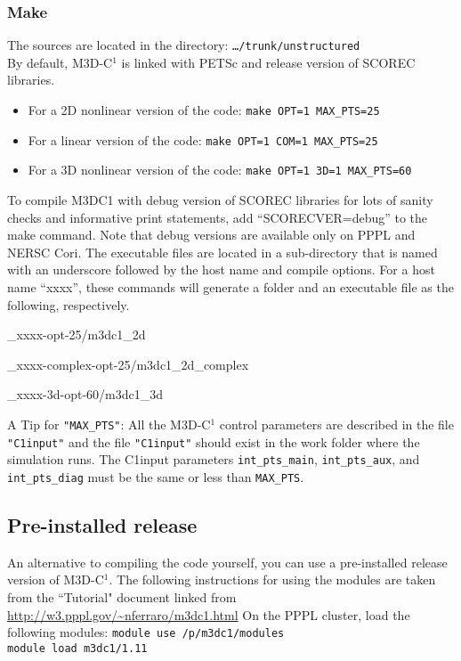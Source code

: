 \subsubsection{Make}
The sources are located in the directory: \texttt{\ldots/trunk/unstructured}
\\
By default, M3D-C$^{1}$ is linked with PETSc and release version of SCOREC libraries.
\\
\begin{itemize}
\item 	For a 2D nonlinear version of the code: \texttt{make OPT=1 MAX\_PTS=25}
\item	For a linear version of the code:  \texttt{make OPT=1 COM=1 MAX\_PTS=25}
\item	For a 3D nonlinear version of the code: \texttt{make OPT=1 3D=1 MAX\_PTS=60}
\end{itemize}
To compile M3DC1 with debug version of SCOREC libraries for lots of sanity checks and informative print statements, add ``SCORECVER=debug'' to the make command. Note that debug versions are available only on PPPL and NERSC Cori.
\newline\newline
The executable files are located in a sub-directory that is named with an underscore followed by the host name and compile options. For a host name ``xxxx'', these commands will generate a folder and an executable file as the following, respectively.
\begin{description}
\item \_xxxx-opt-25/m3dc1\_2d
\item	\_xxxx-complex-opt-25/m3dc1\_2d\_complex
\item \_xxxx-3d-opt-60/m3dc1\_3d
\end{description}
A Tip for \texttt{"MAX\_PTS"}:  All the M3D-C$^{1}$ control parameters are described in the file \texttt{"C1input"} and the file \texttt{"C1input"} should exist in the work folder where the simulation runs. The C1input parameters \texttt{int\_pts\_main}, \texttt{int\_pts\_aux}, and \texttt{int\_pts\_diag} must be the same or less than \texttt{MAX\_PTS}.

\subsection{Pre-installed release}
\label{ch:preinstall}
An alternative to compiling the code yourself, you can use a pre-installed release version of M3D-C$^{1}$.    The following instructions for using the modules are taken from the ``Tutorial" document linked from \href{http://w3.pppl.gov/~nferraro/m3dc1.html}{http://w3.pppl.gov/\~{}nferraro/m3dc1.html}
On the PPPL cluster, load the following modules:
\newline\newline
\texttt{module use /p/m3dc1/modules
\\
module load m3dc1/1.11
}

